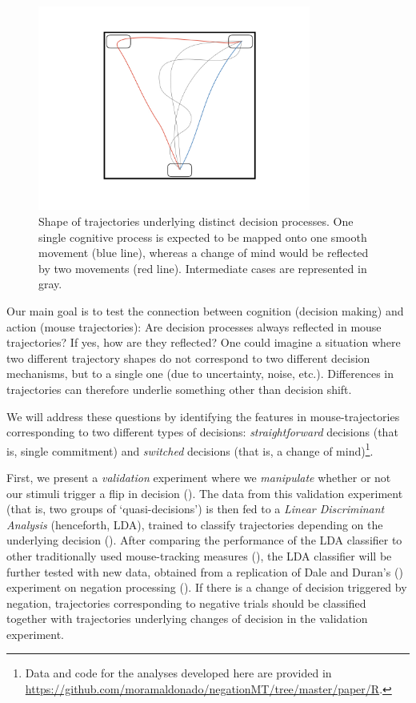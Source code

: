 \documentclass{article}
\begin{document}
\begin{figure}[h]
\centering
\includegraphics[width=0.8\textwidth]{trajectories.jpeg}
\caption{Shape of trajectories underlying distinct decision processes. One single cognitive process is expected to be mapped onto one smooth movement (blue line), whereas a change of mind would be reflected by two movements (red line). Intermediate cases are represented in gray.} \label{fig:scheme.traj}
\end{figure}

Our main goal is to test the connection between cognition (decision making) and action (mouse trajectories): Are decision processes always reflected in mouse trajectories? If yes, how are they reflected? 
One could imagine a situation where two different trajectory shapes do not correspond to two different decision mechanisms, but to a single one (due to uncertainty, noise, etc.). Differences in trajectories can therefore underlie something other than decision shift. 

We will address these questions by identifying the features in mouse-trajectories corresponding to two different types of decisions: \emph{straightforward} decisions (that is, single commitment) and \emph{switched} decisions (that is, a change of mind)\footnote{Data and code for the analyses developed here are provided in \url{https://github.com/moramaldonado/negationMT/tree/master/paper/R}.}. 

First, we present a \emph{validation} experiment where
we \emph{manipulate} whether or not our stimuli trigger a flip in decision (). 
The data from this validation experiment (that is, two groups of `quasi-decisions') is then fed to a \emph{Linear Discriminant Analysis} (henceforth, LDA), trained to classify trajectories depending on the underlying decision (). 
After comparing the performance of the LDA classifier to other traditionally used mouse-tracking measures (), 
the LDA classifier will be further tested with new data, obtained from a replication of Dale and Duran's (\citeyear{Dale2011}) experiment on negation processing (). If there is a change of decision triggered by negation, trajectories corresponding to negative trials should be classified together with trajectories underlying changes of decision in the validation experiment. 
\end{document}
